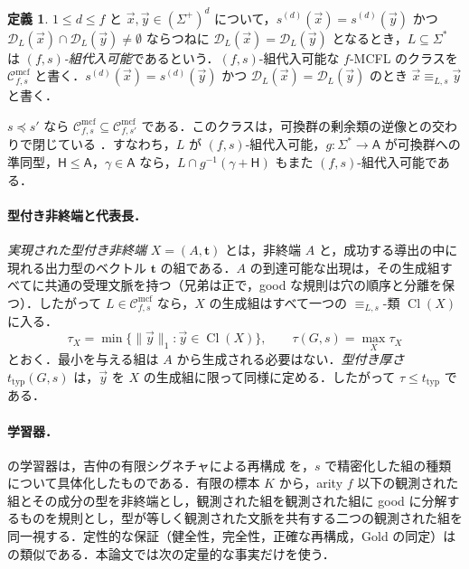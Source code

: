 \documentclass[11pt,a4paper]{ltjsarticle}
\numberwithin{equation}{section}
\theoremstyle{plain}
\theoremstyle{definition}
\newtheorem{definition}[theorem]{定義}
\theoremstyle{remark}
\theoremstyle{plain}
\newcommand{\Cmcf}[2]{\mathcal{C}^{\mathrm{mcf}}_{#1,#2}}
\newcommand{\D}{\mathcal{D}}
\newcommand{\tuple}[1]{\vec{#1}}
\newcommand{\ttyp}{t_{\mathrm{typ}}}
\begin{document}
\begin{definition}
\label{def:class}
$1\le d\le f$ と $\tuple x,\tuple y\in(\Sigma^+)^d$ について，$s^{(d)}(\tuple x)=s^{(d)}(\tuple y)$ かつ $\D_L(\tuple x)\cap\D_L(\tuple y)\ne\emptyset$ ならつねに $\D_L(\tuple x)=\D_L(\tuple y)$ となるとき，$L\subseteq\Sigma^*$ は \emph{$(f,s)$-組代入可能}であるという．$(f,s)$-組代入可能な $f$-MCFL のクラスを $\Cmcf{f}{s}$ と書く．$s^{(d)}(\tuple x)=s^{(d)}(\tuple y)$ かつ $\D_L(\tuple x)=\D_L(\tuple y)$ のとき $\tuple x\equiv_{L,s}\tuple y$ と書く．
\end{definition}

$s\preceq s'$ なら $\Cmcf{f}{s}\subseteq\Cmcf{f}{s'}$ である．このクラスは，可換群の剰余類の逆像との交わりで閉じている \cite[命題 \textit{abelian-coset-filter}]{KuriyamaCompendium}．すなわち，$L$ が $(f,s)$-組代入可能，$g:\Sigma^*\to\mathsf A$ が可換群への準同型，$\mathsf H\le\mathsf A$，$\gamma\in\mathsf A$ なら，$L\cap g^{-1}(\gamma+\mathsf H)$ もまた $(f,s)$-組代入可能である．

\paragraph{型付き非終端と代表長．}
\emph{実現された型付き非終端} $X=(A,\mathbf t)$ とは，非終端 $A$ と，成功する導出の中に現れる出力型のベクトル $\mathbf t$ の組である．$A$ の到達可能な出現は，その生成組すべてに共通の受理文脈を持つ（兄弟は正で，good な規則は穴の順序と分離を保つ）．したがって $L\in\Cmcf{f}{s}$ なら，$X$ の生成組はすべて一つの $\equiv_{L,s}$-類 $\operatorname{Cl}(X)$ に入る．
\[
  \tau_X=\min\{\|\tuple y\|_1:\tuple y\in\operatorname{Cl}(X)\},\qquad
  \tau(G,s)=\max_X\tau_X
\]
とおく．最小を与える組は $A$ から生成される必要はない．\emph{型付き厚さ} $\ttyp(G,s)$ は，$\tuple y$ を $X$ の生成組に限って同様に定める．したがって $\tau\le\ttyp$ である．

\paragraph{学習器．}
\cite{KuriyamaMCFGpreprint,KuriyamaCompendium} の学習器は，吉仲の有限シグネチャによる再構成 \cite{Yoshinaka2015General} を，$s$ で精密化した組の種類について具体化したものである．有限の標本 $K$ から，arity $f$ 以下の観測された組とその成分の型を非終端とし，観測された組を観測された組に good に分解するものを規則とし，型が等しく観測された文脈を共有する二つの観測された組を同一視する．定性的な保証（健全性，完全性，正確な再構成，Gold の同定）は \cite{Yoshinaka2011,Yoshinaka2015General} の類似である．本論文では次の定量的な事実だけを使う．
\end{document}
